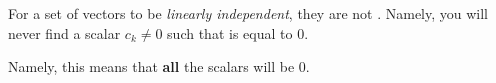 \begin{definition}\label{def:Linearly_Independent}
  For a set of vectors to be \emph{linearly independent}, they are not .
  Namely, you will never find a scalar $c_{k} \neq 0$ such that  is equal to 0.

  \begin{remark*}
    Namely, this means that \textbf{all} the scalars will be 0.
  \end{remark*}
\end{definition}


